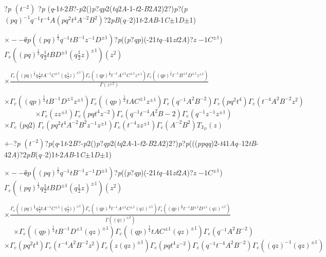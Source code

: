 \documentclass[a4paper,12pt]{article}
\begin{document}
?{\it p} $(t^{-2})$ ?{\it p} ({\it q}-1{\it t}-2{\it B}?-{\it p}2(){\it p}?{\it qp}2({\it tq}2{\it A}-1-{\it t}2-{\it B}2{\it A}2)2?){\it p}?({\it p} $(pq)^{-1}q^{-1}t^{-4}A(pq^{2}t^{4}A^{-2}B^{2})$?2{\it pB}({\it q}--2)1{\it t}-2{\it AB}-1{\it C}$\pm$1{\it D}$\pm$1)

$\times--ё p ((pq)^{\frac{1}{2}}q^{-1}tB^{-1}z^{-1}D^{\pm 1})$?{\it p}(({\it p}?{\it qp})(-21{\it tq}--41{\it zt}2{\it A})?{\it z} $-1C^{\pm 1}$) $\displaystyle \Gamma_{e}((pq)^{\frac{1}{2}}q\frac{1}{2}tBD^{\pm 1}(q\frac{1}{2}z)^{\pm 1})(z^{2})$

$\displaystyle \times\frac{\Gamma_{e}((pq)^{\frac{1}{2}}q\frac{1}{2}tA^{-1}C^{\pm 1}(q\frac{1}{2}z)^{\pm 1})\Gamma_{e}((qp)^{\frac{1}{2}}t^{-1}A^{\pm 1}C^{\pm 1}z^{\pm 1})\Gamma_{e}((qp)^{\frac{1}{2}}t^{-1}B^{\pm 1}D^{\pm 1}z^{\pm 1})}{\Gamma(z^{\pm 2})}$

$\times\Gamma_{e}((qp)^{\frac{1}{2}}tB^{-1}D^{\pm 1}z^{\pm 1})\Gamma_{e}((qp)^{\frac{1}{2}}tAC^{\pm 1}z^{\pm 1})\Gamma_{e}(q^{-1}A^{2}B^{-2})\Gamma_{e}(pq^{2}t^{4})\Gamma_{e}(t^{-4}A^{2}B^{-2}z^{2})$
$$
\times\Gamma_{e}(zz^{\pm 1})\Gamma_{e}(pqt^{4}z^{-2})\Gamma_{e}(q^{-1}t^{-4}A^{2}B-2)\Gamma_{e}(q^{-1}z^{-1}z^{\pm 1})
$$
$\times\Gamma_{e}$ ({\it pq}2) $\Gamma_{e}(pq^{2}t^{4}A^{-2}B^{2}z^{-1}z^{\pm 1})\Gamma_{e}(t^{-4}zz^{\pm 1})\Gamma_{e}(A^{-2}B^{2})T_{\mathrm{J}_{D}}(z)$

$+$--?{\it p} $(t^{-2})$?{\it p}({\it q}-1{\it t}-2{\it B}?-{\it p}2(){\it p}?{\it qp}2({\it tq}2{\it A}-1-{\it t}2-{\it B}2{\it A}2)2?){\it p}?{\it p}((({\it ppqq})2-{\it t}41{\it Aq}--12{\it tB}-42{\it A})?2{\it pB}({\it q}--2)1{\it t}-2{\it AB}-1{\it C}$\pm$1{\it D}$\pm$1)

$\times--ё p ((pq)^{\frac{1}{2}}q^{-1}tB^{-1}z^{-1}D^{\pm 1})$?{\it p}(({\it p}?{\it qp})(-21{\it tq}--41{\it zt}2{\it A})?{\it z} $-1C^{\pm 1}$) $\displaystyle \Gamma_{e}((pq)^{\frac{1}{2}}q\frac{1}{2}tBD^{\pm 1}(q\frac{1}{2}z)^{\pm 1})(z^{2})$

$\displaystyle \times\frac{\Gamma_{e}((pq)^{\frac{1}{2}}q\frac{1}{2}tA^{-1}C^{\pm 1}(q\frac{1}{2}z)^{\pm 1})\Gamma_{e}((qp)^{\frac{1}{2}}t^{-1}A^{\pm 1}C^{\pm 1}(qz)^{\pm 1})\Gamma_{e}((qp)^{\frac{1}{2}}t^{-1}B^{\pm 1}D^{\pm 1}(qz)^{\pm 1})}{\Gamma((qz)^{\pm 2})}$
$$
\times\Gamma_{e}((qp)^{\frac{1}{2}}tB^{-1}D^{\pm 1}(qz)^{\pm 1})\Gamma_{e}((qp)^{\frac{1}{2}}tAC^{\pm 1}(qz)^{\pm 1})\Gamma_{e}(q^{-1}A^{2}B^{-2})
$$
$\times\Gamma_{e}(pq^{2}t^{4})\Gamma_{e}(t^{-4}A^{2}B^{-2}z^{2})\Gamma_{e}(z(qz)^{\pm 1})\Gamma_{e}(pqt^{4}z^{-2})\Gamma_{e}(q^{-1}t^{-4}A^{2}B^{-2})\Gamma_{e}((qz)^{-1}(qz)^{\pm 1})$
\end{document}
